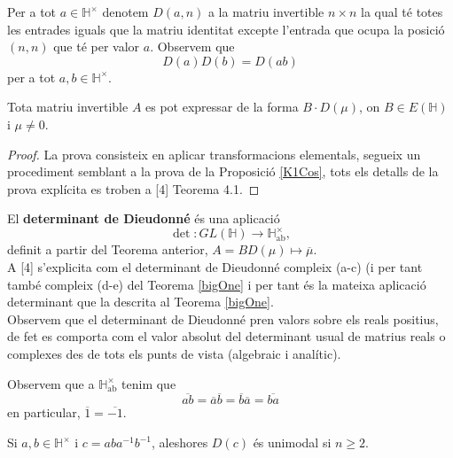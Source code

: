 \begin{definition}Per a tot $a\in \mathbb{H}^\times$ denotem $D(a,n)$ a la matriu invertible $n\times n$ la qual té totes les entrades iguals que la matriu identitat excepte l'entrada que ocupa la posició $(n,n)$ que té per valor $a$. Observem que 
$$
D(a)D(b)=D(ab)
$$
per a tot $a,b\in \mathbb{H}^\times$.
\end{definition}
\begin{theorem}\label{BD}
Tota matriu invertible $A$ es pot expressar de la forma $B\cdot D(\mu)$, on $B\in E(\mathbb{H})$ i $\mu \neq 0$.
\end{theorem}
\begin{proof}
La prova consisteix en aplicar transformacions elementals, segueix un procediment semblant a la prova de la Proposició \ref{K1Cos}, tots els detalls de la prova explícita es troben a [4] Teorema 4.1. 
\end{proof}
\begin{definition}
El \textbf{determinant de Dieudonné} és una aplicació 
$$
\det: GL(\mathbb{H})\rightarrow \mathbb{H}^\times_\text{ab},
$$
definit a partir del Teorema anterior, $A = BD(\mu) \mapsto \overline{\mu}$. \\
\indent A [4] s'explicita com el determinant de Dieudonné compleix (a-c) (i per tant també compleix (d-e) del Teorema \ref{bigOne} i per tant és la mateixa aplicació determinant que la descrita al Teorema \ref{bigOne}. \\
\indent Observem que el determinant de Dieudonné pren valors sobre els reals positius, de fet es comporta com el valor absolut del determinant usual de matrius reals o complexes des de tots els punts de vista (algebraic i analític).
\end{definition}
\begin{obs}
Observem que a $\mathbb{H}^\times_\text{ab}$ tenim que 
$$
\overline{ab}=\overline{a}\overline{b}=\overline{b}\overline{a}=\overline{ba}
$$
en particular, $\overline{1}=\overline{-1}$.

\end{obs}
\begin{theorem}
Si $a,b\in \mathbb{H}^\times$ i $c=aba^{-1}b^{-1}$, aleshores $D(c)$ és unimodal si $n\geq 2$.
\end{theorem}

